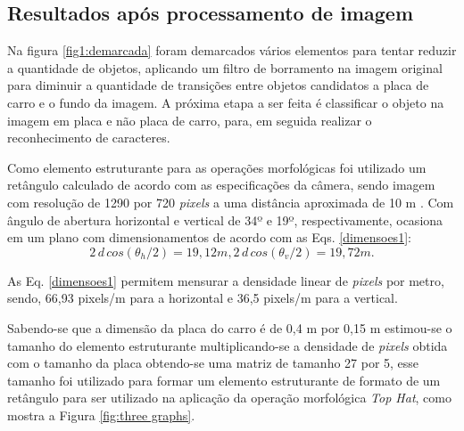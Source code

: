 \subsection{Resultados após processamento de imagem}


Na figura \ref{fig1:demarcada} foram demarcados vários elementos para tentar reduzir a quantidade de objetos, aplicando um filtro de borramento na imagem original para diminuir a quantidade de transições entre objetos candidatos a placa de carro e o fundo da imagem. A próxima etapa a ser feita é classificar o objeto na imagem em placa e não placa de carro, para, em seguida realizar o reconhecimento de caracteres.

Como elemento estruturante para as operações morfológicas foi utilizado um retângulo calculado de acordo com as especificações da câmera, sendo imagem com resolução de 1290 por 720 \emph{pixels} a uma distância aproximada de 10 m . Com ângulo de abertura horizontal e vertical de 34º e 19º, respectivamente, ocasiona em um plano com dimensionamentos de acordo com as Eqs. \ref{dimensoes1}:
\begin{equation}
    2\,d\,cos(\theta_{h} /2) = 19,12 m, 
    2\,d\,cos(\theta_{v} /2) = 19,72 m.
    \label{dimensoes1}
\end{equation}

As Eq. \ref{dimensoes1} permitem mensurar a densidade linear de \emph{pixels} por metro, sendo, 66,93 pixels/m para a horizontal e 36,5 pixels/m para a vertical.

Sabendo-se que a dimensão da placa do carro é de 0,4 m por 0,15 m estimou-se o tamanho do elemento estruturante multiplicando-se a densidade de \emph{pixels} obtida com o tamanho da placa obtendo-se uma matriz de tamanho 27 por 5, esse tamanho foi utilizado para formar um elemento estruturante de formato de um retângulo para ser utilizado na aplicação da operação morfológica \emph{Top Hat}, como mostra a Figura \ref{fig:three graphs}.

